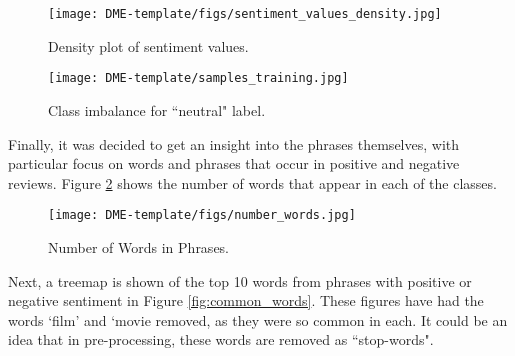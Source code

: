 \documentclass{article}
\begin{document}


\begin{figure}[h]
\centering
\begin{minipage}{.5\textwidth}
    \centering
    \texttt{[image: DME-template/figs/sentiment\_values\_density.jpg]}
    \caption{Density plot of sentiment values.}
    \label{fig:skewness}
\end{minipage}%
\begin{minipage}{.5\textwidth}
    \centering
    \texttt{[image: DME-template/samples\_training.jpg]}
    \caption{Class imbalance for ``neutral" label.}
    \label{training_samples}
\end{minipage}
\end{figure}



Finally, it was decided to get an insight into the phrases themselves, with particular focus on words and phrases that occur in positive and negative reviews. Figure \ref{fig:phrase_words} shows the number of words that appear in each of the classes.

\begin{figure}[h]
    \centering
    \texttt{[image: DME-template/figs/number\_words.jpg]}
    \caption{Number of Words in Phrases.}
    \label{fig:phrase_words}
\end{figure}

Next, a treemap is shown of the top 10 words from phrases with positive or negative sentiment in Figure \ref{fig:common_words}. These figures have had the words `film' and `movie removed, as they were so common in each. It could be an idea that in pre-processing, these words are removed as ``stop-words".
\end{document}

